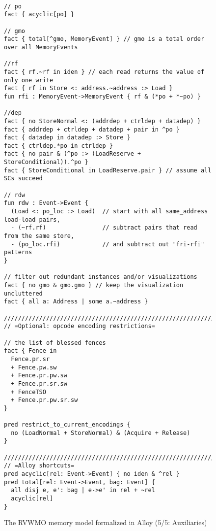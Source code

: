 \begin{figure}[h!]
  {
  \tt\bfseries\centering\footnotesize
  \begin{lstlisting}
// po
fact { acyclic[po] }

// gmo
fact { total[^gmo, MemoryEvent] } // gmo is a total order over all MemoryEvents

//rf
fact { rf.~rf in iden } // each read returns the value of only one write
fact { rf in Store <: address.~address :> Load }
fun rfi : MemoryEvent->MemoryEvent { rf & (*po + *~po) }

//dep
fact { no StoreNormal <: (addrdep + ctrldep + datadep) }
fact { addrdep + ctrldep + datadep + pair in ^po }
fact { datadep in datadep :> Store }
fact { ctrldep.*po in ctrldep }
fact { no pair & (^po :> (LoadReserve + StoreConditional)).^po }
fact { StoreConditional in LoadReserve.pair } // assume all SCs succeed

// rdw
fun rdw : Event->Event {
  (Load <: po_loc :> Load)  // start with all same_address load-load pairs,
  - (~rf.rf)                // subtract pairs that read from the same store,
  - (po_loc.rfi)            // and subtract out "fri-rfi" patterns
}

// filter out redundant instances and/or visualizations
fact { no gmo & gmo.gmo } // keep the visualization uncluttered
fact { all a: Address | some a.~address }

////////////////////////////////////////////////////////////////////////////////
// =Optional: opcode encoding restrictions=

// the list of blessed fences
fact { Fence in
  Fence.pr.sr
  + Fence.pw.sw
  + Fence.pr.pw.sw
  + Fence.pr.sr.sw
  + FenceTSO
  + Fence.pr.pw.sr.sw
}

pred restrict_to_current_encodings {
  no (LoadNormal + StoreNormal) & (Acquire + Release)
}

////////////////////////////////////////////////////////////////////////////////
// =Alloy shortcuts=
pred acyclic[rel: Event->Event] { no iden & ^rel }
pred total[rel: Event->Event, bag: Event] {
  all disj e, e': bag | e->e' in rel + ~rel
  acyclic[rel]
}
\end{lstlisting}}
  \caption{The RVWMO memory model formalized in Alloy (5/5: Auxiliaries)}
  \label{fig:alloy5}
\end{figure}

